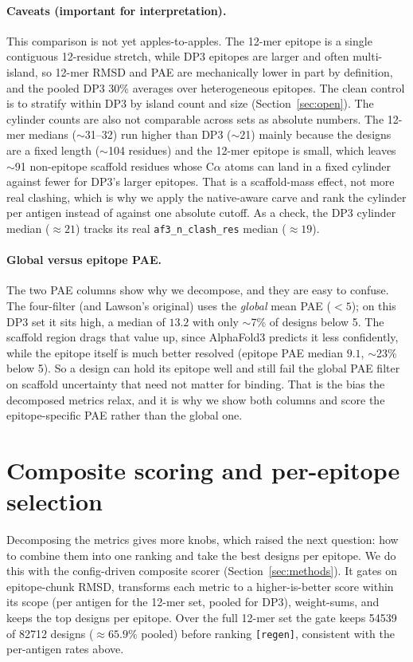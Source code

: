 \paragraph{Caveats (important for interpretation).}
This comparison is not yet apples-to-apples. The 12-mer epitope is a single contiguous
12-residue stretch, while DP3 epitopes are larger and often multi-island, so 12-mer RMSD and
PAE are mechanically lower in part by definition, and the pooled DP3 30\% averages over
heterogeneous epitopes. The clean control is to stratify within DP3 by island count and size
(Section~\ref{sec:open}). The cylinder counts are also not comparable across sets as absolute
numbers. The 12-mer medians ($\sim$31--32) run higher than DP3 ($\sim$21) mainly because the
designs are a fixed length ($\sim$104 residues) and the 12-mer epitope is small, which leaves
$\sim$91 non-epitope scaffold residues whose C$\alpha$ atoms can land in a fixed cylinder
against fewer for DP3's larger epitopes. That is a scaffold-mass effect, not more real
clashing, which is why we apply the native-aware carve and rank the cylinder per antigen
instead of against one absolute cutoff. As a check, the DP3 cylinder median ($\approx 21$)
tracks its real \texttt{af3\_n\_clash\_res} median ($\approx 19$).

\paragraph{Global versus epitope PAE.}
The two PAE columns show why we decompose, and they are easy to confuse. The four-filter (and
Lawson's original) uses the \emph{global} mean PAE ($<5$); on this DP3 set it sits high, a
median of $13.2$ with only $\sim$7\% of designs below 5. The scaffold region drags that value
up, since AlphaFold3 predicts it less confidently, while the epitope itself is much better
resolved (epitope PAE median $9.1$, $\sim$23\% below 5). So a design can hold its epitope well
and still fail the global PAE filter on scaffold uncertainty that need not matter for binding.
That is the bias the decomposed metrics relax, and it is why we show both columns and score
the epitope-specific PAE rather than the global one.

\section{Composite scoring and per-epitope selection}\label{sec:composite}
Decomposing the metrics gives more knobs, which raised the next question: how to combine them
into one ranking and take the best designs per epitope. We do this with the config-driven
composite scorer (Section~\ref{sec:methods}). It gates on epitope-chunk RMSD, transforms each
metric to a higher-is-better score within its scope (per antigen for the 12-mer set, pooled
for DP3), weight-sums, and keeps the top designs per epitope. Over the full 12-mer set the
gate keeps \num{54539} of \num{82712} designs ($\approx 65.9\%$ pooled) before ranking
\texttt{[regen]}, consistent with the per-antigen rates above.

